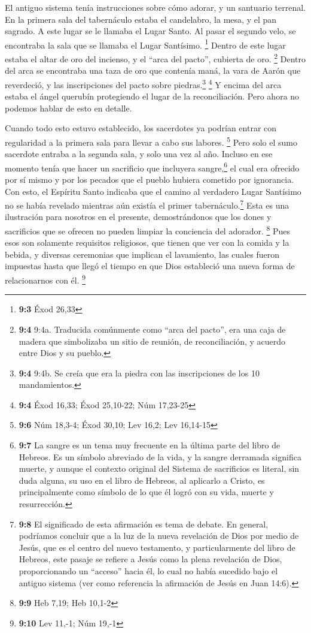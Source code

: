  El antiguo sistema tenía instrucciones sobre cómo adorar,
y un santuario terrenal.  En la primera sala del
tabernáculo estaba el candelabro, la mesa, y el pan sagrado. A este
lugar se le llamaba el Lugar Santo.  Al pasar el segundo
velo, se encontraba la sala que se llamaba el Lugar Santísimo.
\footnote{\textbf{9:3} Éxod 26,33}  Dentro de este lugar
estaba el altar de oro del incienso, y el ``arca del pacto'', cubierta
de oro. \footnote{\textbf{9:4} 9:4a. Traducida comúnmente como ``arca
  del pacto'', era una caja de madera que simbolizaba un sitio de
  reunión, de reconciliación, y acuerdo entre Dios y su pueblo.} Dentro
del arca se encontraba una taza de oro que contenía maná, la vara de
Aarón que reverdeció, y las inscripciones del pacto sobre
piedras.\footnote{\textbf{9:4} 9:4b. Se creía que era la piedra con las
  inscripciones de los 10 mandamientos.} \footnote{\textbf{9:4} Éxod
  16,33; Éxod 25,10-22; Núm 17,23-25}  Y encima del arca
estaba el ángel querubín protegiendo el lugar de la reconciliación. Pero
ahora no podemos hablar de esto en detalle.

 Cuando todo esto estuvo establecido, los sacerdotes ya
podrían entrar con regularidad a la primera sala para llevar a cabo sus
labores. \footnote{\textbf{9:6} Núm 18,3-4; Éxod 30,10; Lev 16,2; Lev
  16,14-15}  Pero solo el sumo sacerdote entraba a la
segunda sala, y solo una vez al año. Incluso en ese momento tenía que
hacer un sacrificio que incluyera sangre,\footnote{\textbf{9:7} La
  sangre es un tema muy frecuente en la última parte del libro de
  Hebreos. Es un símbolo abreviado de la vida, y la sangre derramada
  significa muerte, y aunque el contexto original del Sistema de
  sacrificios es literal, sin duda alguna, su uso en el libro de
  Hebreos, al aplicarlo a Cristo, es principalmente como símbolo de lo
  que él logró con su vida, muerte y resurrección.} el cual era ofrecido
por sí mismo y por los pecados que el pueblo hubiera cometido por
ignorancia.  Con esto, el Espíritu Santo indicaba que el
camino al verdadero Lugar Santísimo no se había revelado mientras aún
existía el primer tabernáculo.\footnote{\textbf{9:8} El significado de
  esta afirmación es tema de debate. En general, podríamos concluir que
  a la luz de la nueva revelación de Dios por medio de Jesús, que es el
  centro del nuevo testamento, y particularmente del libro de Hebreos,
  este pasaje se refiere a Jesús como la plena revelación de Dios,
  proporcionando un ``acceso'' hacia él, lo cual no había sucedido bajo
  el antiguo sistema (ver como referencia la afirmación de Jesús en Juan
  14:6).}  Esta es una ilustración para nosotros en el
presente, demostrándonos que los dones y sacrificios que se ofrecen no
pueden limpiar la conciencia del adorador. \footnote{\textbf{9:9} Heb
  7,19; Heb 10,1-2}  Pues esos son solamente requisitos
religiosos, que tienen que ver con la comida y la bebida, y diversas
ceremonias que implican el lavamiento, las cuales fueron impuestas hasta
que llegó el tiempo en que Dios estableció una nueva forma de
relacionarnos con él. \footnote{\textbf{9:10} Lev 11,-1; Núm 19,-1}

